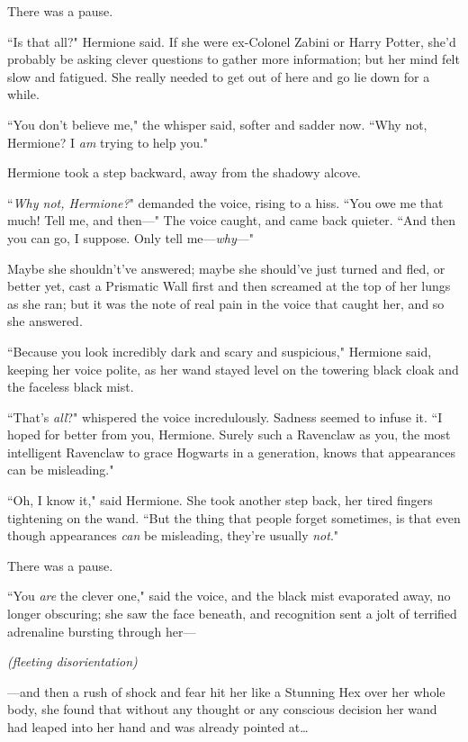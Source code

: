 There was a pause.

``Is that all?" Hermione said. If she were ex-Colonel Zabini or Harry Potter, she'd probably be asking clever questions to gather more information; but her mind felt slow and fatigued. She really needed to get out of here and go lie down for a while.

``You don't believe me," the whisper said, softer and sadder now. ``Why not, Hermione? I \emph{am} trying to help you."

Hermione took a step backward, away from the shadowy alcove.

``\emph{Why not, Hermione?}" demanded the voice, rising to a hiss. ``You owe me that much! Tell me, and then—" The voice caught, and came back quieter. ``And then you can go, I suppose. Only tell me—\emph{why}—"

Maybe she shouldn't've answered; maybe she should've just turned and fled, or better yet, cast a Prismatic Wall first and then screamed at the top of her lungs as she ran; but it was the note of real pain in the voice that caught her, and so she answered.

``Because you look incredibly dark and scary and suspicious," Hermione said, keeping her voice polite, as her wand stayed level on the towering black cloak and the faceless black mist.

``That's \emph{all}?" whispered the voice incredulously. Sadness seemed to infuse it. ``I hoped for better from you, Hermione. Surely such a Ravenclaw as you, the most intelligent Ravenclaw to grace Hogwarts in a generation, knows that appearances can be misleading."

``Oh, I know it," said Hermione. She took another step back, her tired fingers tightening on the wand. ``But the thing that people forget sometimes, is that even though appearances \emph{can} be misleading, they're usually \emph{not}."

There was a pause.

``You \emph{are} the clever one," said the voice, and the black mist evaporated away, no longer obscuring; she saw the face beneath, and recognition sent a jolt of terrified adrenaline bursting through her—

\emph{(fleeting disorientation)}

—and then a rush of shock and fear hit her like a Stunning Hex over her whole body, she found that without any thought or any conscious decision her wand had leaped into her hand and was already pointed at{\ldots}

